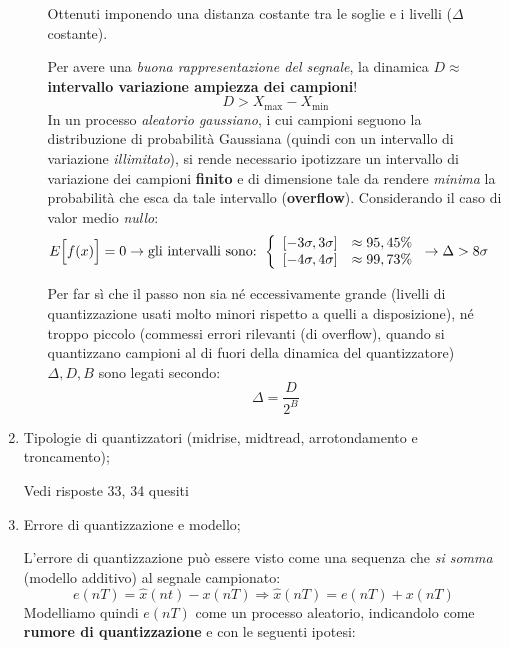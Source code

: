 \documentclass[
]{article}
\begin{document}
\begin{enumerate}
\begin{itemize}
    Ottenuti imponendo una distanza costante tra le soglie e i livelli
    (\(\Delta\) costante).

    Per avere una \emph{buona rappresentazione del segnale}, la dinamica
    \(D \approx\) \textbf{intervallo variazione ampiezza dei campioni}!
    \[
      D > X_{\text{max}}-X_{\text{min}}
      \] In un processo \emph{aleatorio gaussiano}, i cui campioni
    seguono la distribuzione di probabilità Gaussiana (quindi con un
    intervallo di variazione \emph{illimitato}), si rende necessario
    ipotizzare un intervallo di variazione dei campioni \textbf{finito}
    e di dimensione tale da rendere \emph{minima} la probabilità che
    esca da tale intervallo (\textbf{overflow}). Considerando il caso di
    valor medio \emph{nullo}: \begin{align*}
      E\Big[f(x)\Big]=0 &\to \text{gli intervalli sono: }
      \left\{\begin{array}{cl}
      [-3\sigma, 3\sigma] & \approx 95,45 \% \\ \relax 
      [-4\sigma, 4\sigma] & \approx 99,73 \%
      \end{array} \right. \to \Delta > 8\sigma
      \end{align*}

    Per far sì che il passo non sia né eccessivamente grande (livelli di
    quantizzazione usati molto minori rispetto a quelli a disposizione),
    né troppo piccolo (commessi errori rilevanti (di overflow), quando
    si quantizzano campioni al di fuori della dinamica del
    quantizzatore) \(\Delta, D, B\) sono legati secondo: \[
      \Delta=\frac{D}{2^B}
      \]
  \end{itemize}
\item
  Tipologie di quantizzatori (midrise, midtread, arrotondamento e
  troncamento);

  Vedi risposte 33, 34 quesiti
\item
  Errore di quantizzazione e modello;

  L'errore di quantizzazione può essere visto come una sequenza che
  \emph{si somma} (modello additivo) al segnale campionato: \[
  e(nT)=\hat{x}(nt)-x(nT) \Rightarrow \hat{x}(nT) = e(nT)+x(nT)
  \] Modelliamo quindi \(e(nT)\) come un processo aleatorio, indicandolo
  come \textbf{rumore di quantizzazione} e con le seguenti ipotesi:


\end{enumerate}
\end{document}
